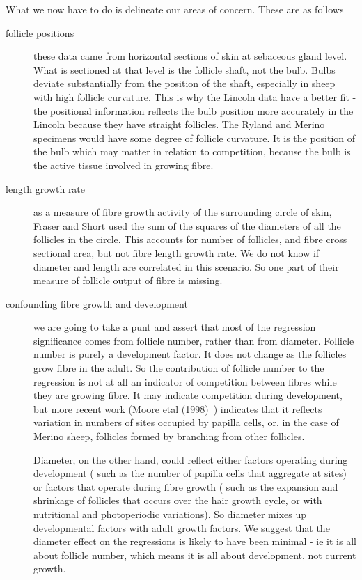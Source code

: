 \documentclass[titlepage]{article}  %
\begin{document}
What we now have to do is delineate our areas of concern. These are as follows
\begin{description}
\item[follicle positions] these data came from horizontal sections of skin at sebaceous gland level. What is sectioned at that level is the follicle shaft, not the bulb.  Bulbs deviate substantially from the position of the shaft, especially in sheep with high follicle curvature. This is why the Lincoln data have a better fit - the positional information reflects the bulb position more accurately in the Lincoln because they have straight follicles. The Ryland and Merino specimens would have some degree of follicle curvature. 
It is the position of the bulb which may matter in relation to competition, because the bulb is the active tissue involved in growing fibre. 
\item[length growth rate] as a measure of fibre growth activity of the surrounding circle of skin, Fraser and Short used the sum of the squares of the diameters of all the follicles in the circle. This accounts for number of follicles, and fibre cross sectional area, but not fibre length growth rate.  We do not know if diameter and length are correlated in this scenario. So one part of their measure of follicle output of fibre is missing.
\item[confounding fibre growth and development] we are going to take a punt and assert that most of the regression significance comes from follicle number, rather than from diameter. Follicle number is purely a development factor. It does not change as the follicles grow fibre in the adult. So the contribution of follicle number to the regression is not at all an indicator of competition between fibres while they are growing fibre. It may indicate competition during development, but more recent work (Moore etal (1998)~\cite{moor:98}) indicates that it reflects variation in numbers of sites occupied by papilla cells, or, in the case of Merino sheep, follicles formed by branching from other follicles. 

Diameter, on the other hand, could reflect either factors operating during development ( such as the number of papilla cells that aggregate at sites) or factors that operate during fibre growth ( such as the expansion and shrinkage of follicles that occurs over the hair growth cycle, or with nutritional and photoperiodic variations). So diameter mixes up developmental factors with adult growth factors.  We suggest that the diameter effect on the regressions is likely to have been minimal - ie it is all about follicle number, which means it is all about development, not current growth.
\end{description}
\end{document}
